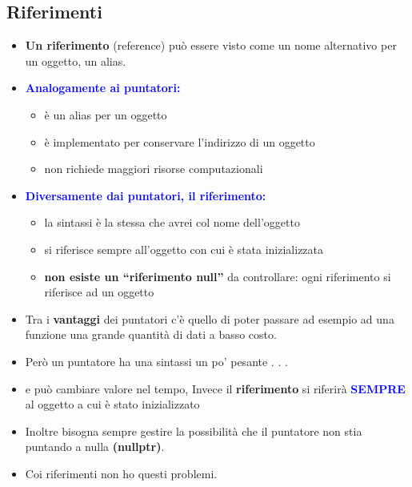 \subsection{Riferimenti}
\begin{itemize}
    \item  \textbf{Un riferimento} (reference) può essere visto come un nome
    alternativo per un oggetto, un alias.
    \item \textcolor{blue}{\textbf{Analogamente ai puntatori:}}
    \begin{itemize}
        \item è un alias per un oggetto
        \item è implementato per conservare l’indirizzo di un oggetto
        \item non richiede maggiori risorse computazionali
    \end{itemize}

    \item \textcolor{blue}{\textbf{Diversamente dai puntatori, il riferimento:}}
    \begin{itemize}
        \item la sintassi è la stessa che avrei col nome dell'oggetto
        \item si riferisce sempre all'oggetto con cui è stata inizializzata
        \item \textbf{non esiste un “riferimento null”} da controllare: ogni
        riferimento si riferisce ad un oggetto
        
    \end{itemize}
    \item Tra i \textbf{vantaggi} dei puntatori c’è quello di poter passare ad
    esempio ad una funzione una grande quantità di dati a
    basso costo.
    \item Però un puntatore ha una sintassi un po’ pesante . . .
    \item e può cambiare valore nel tempo, Invece il \textbf{riferimento} si riferirà \textbf{\textcolor{blue}{SEMPRE}} al oggetto a cui è stato inizializzato
    \item Inoltre bisogna sempre gestire la possibilità che il
    puntatore non stia puntando a nulla \textbf{(nullptr)}.
    \item Coi riferimenti non ho questi problemi.

\end{itemize}


